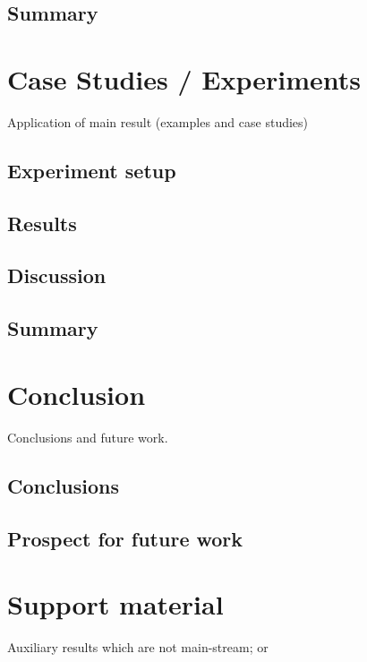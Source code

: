 \documentclass[
  oneside,
  11pt, a4paper,
  footinclude=true,
  headinclude=true,
  cleardoublepage=empty
]{scrbook}
\begin{document}
	\section{Summary}


	\chapter{Case Studies / Experiments}
		Application of main result (examples and case studies)
	\section{Experiment setup}
    \section{Results}
    \section{Discussion}
	\section{Summary}

	\chapter{Conclusion}
		Conclusions and future work.
	\section{Conclusions}
	\section{Prospect for future work}
			

	

	
	
	
	\chapter{Support material}
	Auxiliary results which are not main-stream; or
\end{document}
